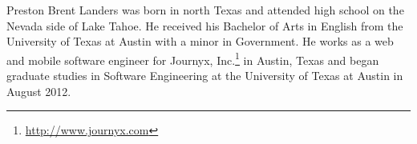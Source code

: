 \documentclass[12pt]{report}	%
\theoremstyle{definition}
\theoremstyle{remark}
\begin{document}

\begin{vita}
\renewcommand{\thefootnote}{\fnsymbol{footnote}}
Preston Brent Landers
was born in north Texas and attended high school on the Nevada side of Lake Tahoe. 
He received his Bachelor of Arts in English from the University of Texas at Austin with a minor in Government.
He works as a web and mobile software engineer for Journyx, Inc.\footnote[1]{\url{http://www.journyx.com}}
in Austin, Texas and began graduate studies in Software Engineering at 
the University of Texas at Austin in August 2012.

\end{vita}
\end{document}
